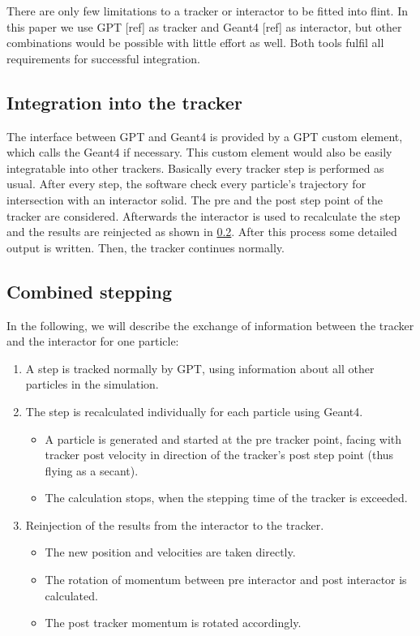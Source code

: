 \documentclass[3p, twocolumn, number, a4paper, 10pt, oneside, preprint]{elsarticle}
\begin{document}
There are only few limitations to a tracker or interactor to be fitted into flint. In this paper we use GPT [ref] as tracker and Geant4 [ref] as interactor, but other combinations would be possible with little effort as well. Both tools fulfil all requirements for successful integration.

\subsection{Integration into the tracker}
\label{integration}

The interface between GPT and Geant4 is provided by a GPT custom element, which calls the Geant4 if necessary. This custom element would also be easily integratable into other trackers. Basically every tracker step is performed as usual. After every step, the software check every particle's trajectory for intersection with an interactor solid. The pre and the post step point of the tracker are considered. Afterwards the interactor is used to recalculate the step and the results are reinjected as shown in \ref{stepping}. After this process some detailed output is written. Then, the tracker continues normally.

\subsection{Combined stepping}
\label{stepping}

In the following, we will describe the exchange of information between the tracker and the interactor for one particle:

\begin{enumerate}[1.]
	\item A step is tracked normally by GPT, using information about all other particles in the simulation.
	\item The step is recalculated individually for each particle using Geant4.
		\begin{itemize}
			\item A particle is generated and started at the pre tracker point, facing with tracker post velocity in direction of the tracker's post step point (thus flying as a secant).
			\item The calculation stops, when the stepping time of the tracker is exceeded.
		\end{itemize}
	\item Reinjection of the results from the interactor to the tracker.
		\begin{itemize}
			\item The new position and velocities are taken directly.
			\item The rotation of momentum between pre interactor and post interactor is calculated.
			\item The post tracker momentum is rotated accordingly.
		\end{itemize}
\end{enumerate}
\end{document}
